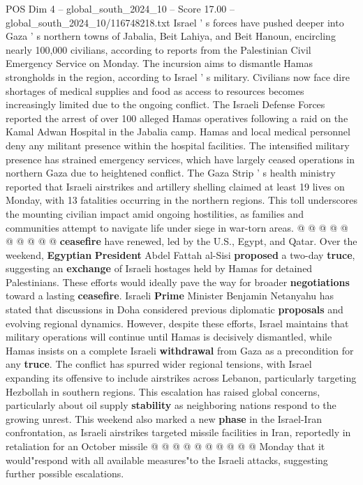 \begin{textsample}{POS Dim 4 – global\_south\_2024\_10 – Score 17.00 – global\_south\_2024\_10/116748218.txt}  \label{ex:f4_pos_396}
Israel ' s forces have pushed deeper into Gaza ' s northern towns of Jabalia, Beit Lahiya, and Beit Hanoun, encircling nearly 100,000 civilians, according to reports from the Palestinian Civil Emergency Service on Monday.
The incursion aims to dismantle Hamas strongholds in the region, according to Israel ' s military.
Civilians now face dire shortages of medical supplies and food as access to resources becomes increasingly limited due to the ongoing conflict.
The Israeli Defense Forces reported the arrest of over 100 alleged Hamas operatives following a raid on the Kamal Adwan Hospital in the Jabalia camp.
Hamas and local medical personnel deny any militant presence within the hospital facilities.
The intensified military presence has strained emergency services, which have largely ceased operations in northern Gaza due to heightened conflict.
The Gaza Strip ' s health ministry reported that Israeli airstrikes and artillery shelling claimed at least 19 lives on Monday, with 13 fatalities occurring in the northern regions.
This toll underscores the mounting civilian impact amid ongoing hostilities, as families and communities attempt to navigate life under siege in war-torn areas. @ @ @ @ @ @ @ @ @ @ \textbf{ceasefire} have renewed, led by the U.S., Egypt, and Qatar.
Over the weekend, \textbf{Egyptian} \textbf{President} Abdel Fattah al-Sisi \textbf{proposed} a two-day \textbf{truce}, suggesting an \textbf{exchange} of Israeli hostages held by Hamas for detained Palestinians.
These efforts would ideally pave the way for broader \textbf{negotiations} toward a lasting \textbf{ceasefire}.
Israeli \textbf{Prime} Minister Benjamin Netanyahu has stated that discussions in Doha considered previous diplomatic \textbf{proposals} and evolving regional dynamics.
However, despite these efforts, Israel maintains that military operations will continue until Hamas is decisively dismantled, while Hamas insists on a complete Israeli \textbf{withdrawal} from Gaza as a precondition for any \textbf{truce}.
The conflict has spurred wider regional tensions, with Israel expanding its offensive to include airstrikes across Lebanon, particularly targeting Hezbollah in southern regions.
This escalation has raised global concerns, particularly about oil supply \textbf{stability} as neighboring nations respond to the growing unrest.
This weekend also marked a new \textbf{phase} in the Israel-Iran confrontation, as Israeli airstrikes targeted missile facilities in Iran, reportedly in retaliation for an October missile @ @ @ @ @ @ @ @ @ @ Monday that it would"respond with all available measures"to the Israeli attacks, suggesting further possible escalations.

\end{textsample}
